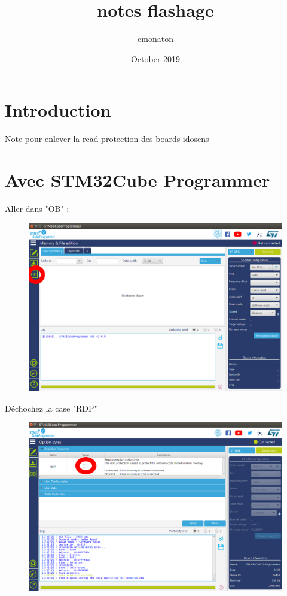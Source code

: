 \documentclass{article}
\title{notes flashage}
\author{cmonaton }
\date{October 2019}
\begin{document}
\maketitle

\section{Introduction}
Note pour enlever la read-protection des boards idosens

\section{Avec STM32Cube Programmer}
Aller dans "OB" :
\begin{figure}[H]
\begin{center}
\advance\leftskip-3cm
\advance\rightskip-3cm
\includegraphics[keepaspectratio=true,scale=0.4]{stm32cubeprgm1.png}
\label{visina8}
\end{center}\end{figure}
Déchochez la case "RDP"
\begin{figure}[H]
\begin{center}
\advance\leftskip-3cm
\advance\rightskip-3cm
\includegraphics[keepaspectratio=true,scale=0.4]{stm32Cubeprogrammer_readoutprotection.png}
\label{visina8}
\end{center}\end{figure}
\end{document}
